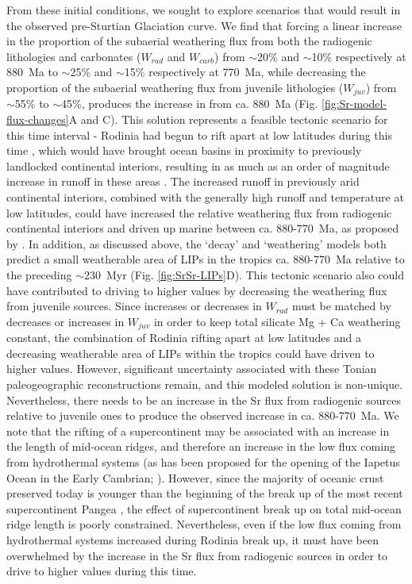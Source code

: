 From these initial conditions, we sought to explore scenarios that would result in the observed pre-Sturtian Glaciation \SrSr curve. We find that forcing a linear increase in the proportion of the subaerial weathering flux from both the radiogenic lithologies and carbonates ($W_{rad}$ and $W_{carb}$) from $\sim$20\% and $\sim$10\% respectively at 880~Ma to $\sim$25\% and $\sim$15\% respectively at 770~Ma, while decreasing the proportion of the subaerial weathering flux from juvenile lithologies ($W_{juv}$) from $\sim$55\% to $\sim$45\%, produces the increase in \SrSr from ca. 880~Ma (Fig. \ref{fig:Sr-model-flux-changes}A and C). This solution represents a feasible tectonic scenario for this time interval - Rodinia had begun to rift apart at low latitudes during this time \citep{Li2008a}, which would have brought ocean basins in proximity to previously landlocked continental interiors, resulting in as much as an order of magnitude increase in runoff in these areas \citep{Godderis2017a}. The increased runoff in previously arid continental interiors, combined with the generally high runoff and temperature at low latitudes, could have increased the relative weathering flux from radiogenic continental interiors and driven up marine \SrSr between ca. 880-770~Ma, as proposed by \citet{Halverson2007b}. In addition, as discussed above, the `decay' and `weathering' models both predict a small weatherable area of LIPs in the tropics ca. 880-770~Ma relative to the preceding $\sim$230~Myr (Fig. \ref{fig:SrSr-LIPs}D). This tectonic scenario also could have contributed to driving \SrSr to higher values by decreasing the weathering flux from juvenile sources. Since increases or decreases in $W_{rad}$ must be matched by decreases or increases in $W_{juv}$ in order to keep total silicate Mg + Ca weathering constant, the combination of Rodinia rifting apart at low latitudes and a decreasing weatherable area of LIPs within the tropics could have driven \SrSr to higher values. However, significant uncertainty associated with these Tonian paleogeographic reconstructions remain, and this modeled solution is non-unique. Nevertheless, there needs to be an increase in the Sr flux from radiogenic sources relative to juvenile ones to produce the observed increase in \SrSr ca. 880-770~Ma. We note that the rifting of a supercontinent may be associated with an increase in the length of mid-ocean ridges, and therefore an increase in the low \SrSr flux coming from hydrothermal systems (as has been proposed for the opening of the Iapetus Ocean in the Early Cambrian; \citealp{Maloof2010a}). However, since the majority of oceanic crust preserved today is younger than the beginning of the break up of the most recent supercontinent Pangea \citep{Muller2008a}, the effect of supercontinent break up on total mid-ocean ridge length is poorly constrained. Nevertheless, even if the low \SrSr flux coming from hydrothermal systems increased during Rodinia break up, it must have been overwhelmed by the increase in the Sr flux from radiogenic sources in order to drive \SrSr to higher values during this time.

